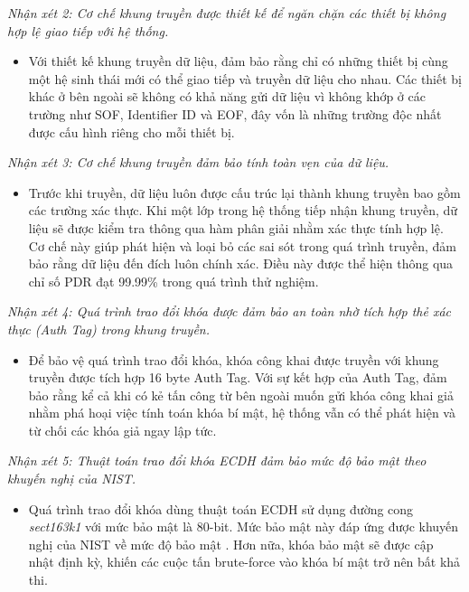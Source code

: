 \textit{Nhận xét 2: Cơ chế khung truyền được thiết kế để ngăn chặn các thiết bị không hợp lệ giao tiếp với hệ thống.}
\begin{itemize}
    \item Với thiết kế khung truyền dữ liệu, đảm bảo rằng chỉ có những thiết bị cùng một hệ sinh thái mới có thể giao tiếp và truyền dữ liệu cho nhau. Các thiết bị khác ở bên ngoài sẽ không có khả năng gửi dữ liệu vì không khớp ở các trường như SOF, Identifier ID và EOF, đây vốn là những trường độc nhất được cấu hình riêng cho mỗi thiết bị.
\end{itemize}

\textit{Nhận xét 3: Cơ chế khung truyền đảm bảo tính toàn vẹn của dữ liệu.}
\begin{itemize}
    \item Trước khi truyền, dữ liệu luôn được cấu trúc lại thành khung truyền bao gồm các trường xác thực. Khi một lớp trong hệ thống tiếp nhận khung truyền, dữ liệu sẽ được kiểm tra thông qua hàm phân giải nhằm xác thực tính hợp lệ. Cơ chế này giúp phát hiện và loại bỏ các sai sót trong quá trình truyền, đảm bảo rằng dữ liệu đến đích luôn chính xác. Điều này được thể hiện thông qua chỉ số PDR đạt 99.99\% trong quá trình thử nghiệm.
\end{itemize}

\textit{Nhận xét 4: Quá trình trao đổi khóa được đảm bảo an toàn nhờ tích hợp thẻ xác thực (Auth Tag) trong khung truyền.}
\begin{itemize}
    \item Để bảo vệ quá trình trao đổi khóa, khóa công khai được truyền với khung truyền được tích hợp 16 byte Auth Tag. Với sự kết hợp của Auth Tag, đảm bảo rằng kể cả khi có kẻ tấn công từ bên ngoài muốn gửi khóa công khai giả nhằm phá hoại việc tính toán khóa bí mật, hệ thống vẫn có thể phát hiện và từ chối các khóa giả ngay lập tức. 
\end{itemize}

\textit{Nhận xét 5: Thuật toán trao đổi khóa ECDH đảm bảo mức độ bảo mật theo khuyến nghị của NIST.}
\begin{itemize}
    \item Quá trình trao đổi khóa dùng thuật toán ECDH sử dụng đường cong \textit{sect163k1} với mức bảo mật là 80-bit. Mức bảo mật này đáp ứng được khuyến nghị của NIST về mức độ bảo mật \cite{nist}. Hơn nữa, khóa bảo mật sẽ được cập nhật định kỳ, khiến các cuộc tấn brute-force vào khóa bí mật trở nên bất khả thi.
\end{itemize}

